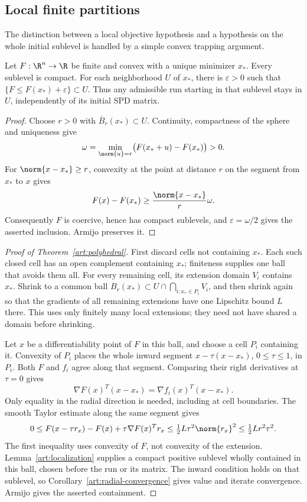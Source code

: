 \subsection{Local finite partitions}

The distinction between a local objective hypothesis and a hypothesis on the
whole initial sublevel is handled by a simple convex trapping argument.

\begin{lemma}\label{art:localization}
Let $F:\R^n\to\R$ be finite and convex with a unique minimizer $x_*$.
Every sublevel is compact. For each neighborhood $U$ of $x_*$, there is
$\varepsilon>0$ such that $\{F\le F(x_*)+\varepsilon\}\subset U$.
Thus any admissible run starting in that sublevel stays in $U$, independently
of its initial SPD matrix.
\end{lemma}
\begin{proof}
Choose $r>0$ with $\overline B_r(x_*)\subset U$.
Continuity, compactness of the sphere and uniqueness give
\[
 \omega=\min_{\norm{u}=r}\bigl(F(x_*+u)-F(x_*)\bigr)>0.
\]
For $\norm{x-x_*}\ge r$, convexity at the point at distance $r$ on the
segment from $x_*$ to $x$ gives
\[
 F(x)-F(x_*)\ge\frac{\norm{x-x_*}}r\omega.
\]
Consequently $F$ is coercive, hence has compact sublevels, and
$\varepsilon=\omega/2$ gives the asserted inclusion. Armijo preserves it.
\end{proof}

\begin{proof}[Proof of Theorem~\ref{art:polyhedral}]
First discard cells not containing $x_*$. Each such closed cell has an open
complement containing $x_*$; finiteness supplies one ball that avoids them all.
For every remaining cell, its extension domain $V_i$ contains $x_*$.
Shrink to a common ball $B_r(x_*)\subset U\cap\bigcap_{i:x_*\in P_i}V_i$,
and then shrink again so that the gradients of all remaining extensions have
one Lipschitz bound $L$ there. This uses only finitely many local extensions;
they need not have shared a domain before shrinking.

Let $x$ be a differentiability point of $F$ in this ball, and choose a cell
$P_i$ containing it. Convexity of $P_i$ places the whole inward segment
$x-\tau(x-x_*)$, $0\le\tau\le1$, in $P_i$. Both $F$ and $f_i$ agree
along that segment. Comparing their right derivatives at $\tau=0$ gives
\[
 \nabla F(x)^T(x-x_*)=\nabla f_i(x)^T(x-x_*).
\]
Only equality in the radial direction is needed, including at cell boundaries.
The smooth Taylor estimate along the same segment gives
\[
 0\le F(x-\tau r_x)-F(x)+\tau\nabla F(x)^Tr_x
       \le\tfrac12L\tau^2\norm{r_x}^2
       \le\tfrac12Lr^2\tau^2.
\]
The first inequality uses convexity of $F$, not convexity of the extension.
Lemma~\ref{art:localization} supplies a compact positive sublevel wholly
contained in this ball, chosen before the run or its matrix. The inward
condition holds on that sublevel, so Corollary~\ref{art:radial-convergence}
gives value and iterate convergence. Armijo gives the asserted containment.
\end{proof}

